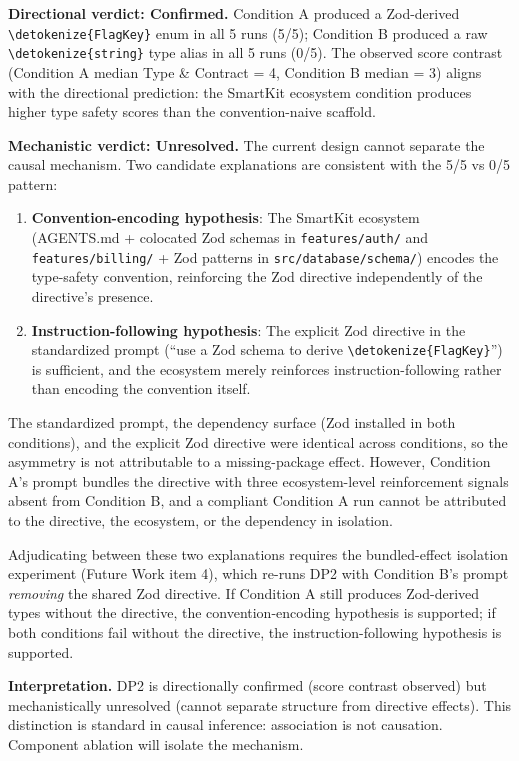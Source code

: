 \documentclass[12pt,a4paper]{report}
\newcommand{\code}[1]{\texttt{\nolinkurl{\detokenize{#1}}}}
\DeclareRobustCommand{\filename}[1]{\bgroup\urlstyle{tt}\nolinkurl{#1}\egroup}
\begin{document}
\textbf{Directional verdict: Confirmed.} Condition A produced a Zod-derived \code{FlagKey} enum in all 5 runs (5/5); Condition B produced a raw \code{string} type alias in all 5 runs (0/5). The observed score contrast (Condition A median Type \& Contract = 4, Condition B median = 3) aligns with the directional prediction: the SmartKit ecosystem condition produces higher type safety scores than the convention-naive scaffold.

\textbf{Mechanistic verdict: Unresolved.} The current design cannot separate the causal mechanism. Two candidate explanations are consistent with the 5/5 vs 0/5 pattern:

\begin{enumerate}
    \item \textbf{Convention-encoding hypothesis}: The SmartKit ecosystem (AGENTS.md + colocated Zod schemas in \filename{features/auth/} and \filename{features/billing/} + Zod patterns in \filename{src/database/schema/}) encodes the type-safety convention, reinforcing the Zod directive independently of the directive's presence.
    \item \textbf{Instruction-following hypothesis}: The explicit Zod directive in the standardized prompt (``use a Zod schema to derive \code{FlagKey}'') is sufficient, and the ecosystem merely reinforces instruction-following rather than encoding the convention itself.
\end{enumerate}

The standardized prompt, the dependency surface (Zod installed in both conditions), and the explicit Zod directive were identical across conditions, so the asymmetry is not attributable to a missing-package effect. However, Condition A's prompt bundles the directive with three ecosystem-level reinforcement signals absent from Condition B, and a compliant Condition A run cannot be attributed to the directive, the ecosystem, or the dependency in isolation.

Adjudicating between these two explanations requires the bundled-effect isolation experiment (Future Work item 4), which re-runs DP2 with Condition B's prompt \emph{removing} the shared Zod directive. If Condition A still produces Zod-derived types without the directive, the convention-encoding hypothesis is supported; if both conditions fail without the directive, the instruction-following hypothesis is supported.

\textbf{Interpretation.} DP2 is directionally confirmed (score contrast observed) but mechanistically unresolved (cannot separate structure from directive effects). This distinction is standard in causal inference: association is not causation. Component ablation will isolate the mechanism.
\end{document}

